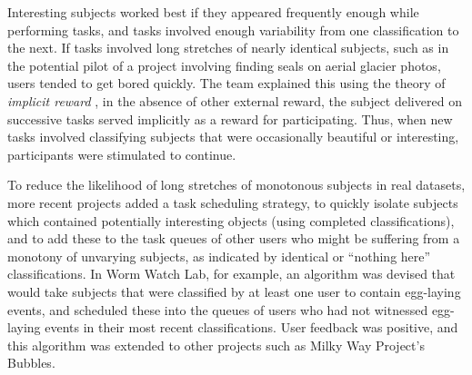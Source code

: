 \documentclass{sigchi}
\begin{document}
Interesting subjects worked best if they appeared frequently enough while performing tasks, and tasks involved enough variability from one classification to the next.  If tasks involved long stretches of nearly identical subjects, such as in the potential pilot of a project involving finding seals on aerial glacier photos, users tended to get bored quickly. The team explained this using the theory of \emph{implicit reward} \cite{kluger1996effects}, in the absence of other external reward, the subject delivered on successive tasks served implicitly as a reward for participating. Thus, when new tasks involved classifying subjects that were occasionally beautiful or interesting, participants were stimulated to continue. %

To reduce the likelihood of long stretches of monotonous subjects in real datasets, more recent projects added a task scheduling strategy, to quickly isolate subjects which contained potentially interesting objects (using completed classifications), and to add these to the task queues of other users who might be suffering from a monotony of unvarying subjects, as indicated by identical or ``nothing here'' classifications.  In Worm Watch Lab, for example, an algorithm was devised that would take subjects that were classified by at least one user to contain egg-laying events, and scheduled these into the queues of users who had not witnessed egg-laying events in their most recent classifications.  User feedback was positive, and this algorithm was extended to other projects such as Milky Way Project's Bubbles. 


\end{document}

